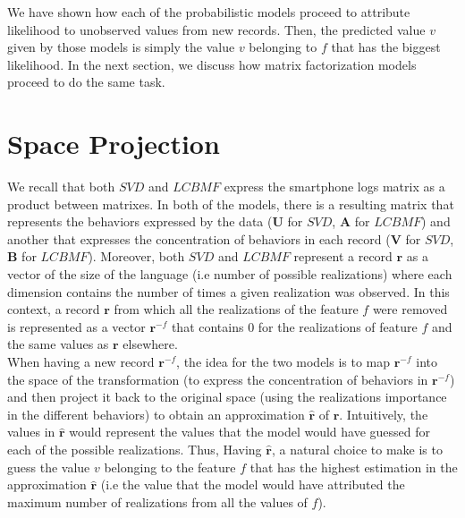 We have shown how each of the probabilistic models proceed to attribute likelihood to unobserved values from new records. Then, the predicted value $v$ given by those models is simply the value $v$ belonging to $f$ that has the biggest likelihood. In the next section, we discuss how matrix factorization models proceed to do the same task.


\section{Space Projection}

We recall that both $SVD$ and $LCBMF$ express the smartphone logs matrix as a product between matrixes. In both of the models, there is a resulting matrix that represents the behaviors expressed by the data ($\boldsymbol{U}$ for $SVD$, $\boldsymbol{A}$ for $LCBMF$) and another that expresses the concentration of behaviors in each record ($\boldsymbol{V}$ for $SVD$, $\boldsymbol{B}$ for $LCBMF$). Moreover, both $SVD$ and $LCBMF$ represent a record $\mathbf{r}$ as a vector of the size of the language (i.e number of possible realizations) where each dimension contains the number of times a given realization was observed. In this context, a record $\mathbf{r}$ from which all the realizations of the feature $f$ were removed is represented as a vector $\mathbf{r}^{-f}$ that contains $0$ for the realizations of feature $f$ and the same values as $\mathbf{r}$ elsewhere.
\\When having a new record $\mathbf{r}^{-f}$, the idea for the two models is to map $\mathbf{r}^{-f}$ into the space of the transformation (to express the concentration of behaviors in  $\mathbf{r}^{-f}$) and then project it back to the original space (using the realizations importance in the different behaviors) to obtain an approximation $\mathbf{\widehat{r}}$ of $\mathbf{r}$. Intuitively, the values in $\mathbf{\widehat{r}}$ would represent the values that the model would have guessed for each of the possible realizations. Thus, Having $\mathbf{\widehat{r}}$, a natural choice to make is to guess the value $v$ belonging to the feature $f$ that has the highest estimation in the approximation $\mathbf{\widehat{r}}$ (i.e the value that the model would have attributed the maximum number of realizations from all the values of $f$). \par

